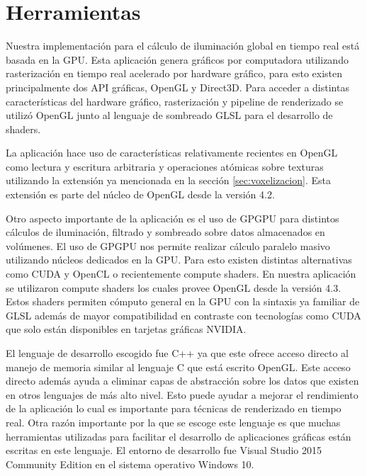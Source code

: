 \section{Herramientas}
Nuestra implementación para el cálculo de iluminación global en tiempo real está basada en la \ac{GPU}. Esta aplicación genera gráficos por computadora utilizando rasterización en tiempo real acelerado por hardware gráfico, para esto existen principalmente dos  API gráficas, OpenGL y Direct3D. Para acceder a distintas características del hardware gráfico, rasterización y pipeline de renderizado se utilizó OpenGL junto al lenguaje de sombreado GLSL para el desarrollo de shaders. 

La aplicación hace uso de características relativamente recientes en OpenGL como lectura y escritura arbitraria y operaciones atómicas sobre texturas utilizando la extensión ya mencionada en la sección \ref{sec:voxelizacion}. Esta extensión es parte del núcleo de OpenGL desde la versión 4.2. 

Otro aspecto importante de la aplicación es el uso de \ac{GPGPU} para distintos cálculos de iluminación, filtrado y sombreado sobre datos almacenados en volúmenes. El uso de \ac{GPGPU} nos permite realizar cálculo paralelo masivo utilizando núcleos dedicados en la \ac{GPU}. Para esto existen distintas alternativas como CUDA y OpenCL o recientemente compute shaders. En nuestra aplicación se utilizaron compute shaders los cuales provee OpenGL desde la versión 4.3. Estos shaders permiten cómputo general en la GPU con la sintaxis ya familiar de GLSL además de mayor compatibilidad en contraste con tecnologías como CUDA que solo están disponibles en tarjetas gráficas NVIDIA.

El lenguaje de desarrollo escogido fue C++ ya que este ofrece acceso directo al manejo de memoria similar al lenguaje C que está escrito OpenGL. Este acceso directo además ayuda a eliminar capas de abstracción sobre los datos que existen en otros lenguajes de más alto nivel. Esto puede ayudar a mejorar el rendimiento de la aplicación lo cual es importante para técnicas de renderizado en tiempo real. Otra razón importante por la que se escoge este lenguaje es que muchas herramientas utilizadas para facilitar el desarrollo de aplicaciones gráficas están escritas en este lenguaje. El entorno de desarrollo fue Visual Studio 2015 Community Edition en el sistema operativo Windows 10.

